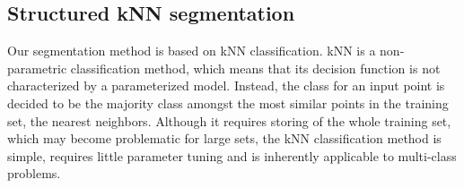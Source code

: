 
\subsection{Structured \acl{kNN} segmentation}

Our segmentation method is based on \acf{kNN} classification. \ac{kNN} is a non-parametric classification method, which means that its decision function is not characterized by a parameterized model. Instead, the class for an input point is decided to be the majority class amongst the most similar points in the training set, the nearest neighbors. Although it requires storing of the whole training set, which may become problematic for large sets, the \ac{kNN} classification method is simple, requires little parameter tuning and is inherently applicable to multi-class problems. 


